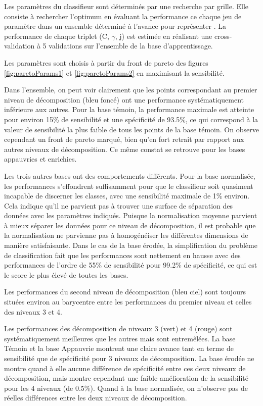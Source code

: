 Les paramètres du classifieur sont déterminés par une recherche par grille. Elle consiste à rechercher l'optimum en évaluant la performance ce chaque jeu de paramètre dans un ensemble déterminé à l'avance pour représenter . La performance de chaque triplet (C, $\gamma$, j) est estimée en réalisant une cross-validation à 5 validations sur l'ensemble de la base d'apprentissage.


Les paramètres sont choisis à partir du front de pareto des figures \ref{fig:paretoParams1} et \ref{fig:paretoParams2} en maximisant la sensibilité.

Dans l'ensemble, on peut voir clairement que les points correspondant au premier niveau de décomposition (bleu foncé) ont une performance systématiquement inférieure aux autres. Pour la base témoin, la performance maximale est atteinte pour environ 15\% de sensibilité et une spécificité de 93.5\%, ce qui correspond à la valeur de sensibilité la plus faible de tous les points de la base témoin. On observe cependant un front de pareto marqué, bien qu'en fort retrait par rapport aux autres niveaux de décomposition. Ce même constat se retrouve pour les bases appauvries et enrichies.

Les trois autres bases ont des comportements différents. Pour la base normalisée, les performances s'effondrent suffisamment pour que le classifieur soit quasiment incapable de discerner les classes, avec une sensibilité maximale de 1\% environ. Cela indique qu'il ne parvient pas à trouver une surface de séparation des données avec les paramètres indiqués. Puisque la normalisation moyenne parvient à mieux séparer les données pour ce niveau de décomposition, il est probable que la normalisation ne parvienne pas à homogénéiser les différentes dimensions de manière satisfaisante. Dans le cas de la base érodée, la simplification du problème de classification fait que les performances sont nettement en hausse avec des performances de l'ordre de 55\% de sensibilité pour 99.2\% de spécificité, ce qui est le score le plus élevé de toutes les bases. 

Les performances du second niveau de décomposition (bleu ciel) sont toujours situées environ au barycentre entre les performances du premier niveau et celles des niveaux 3 et 4.

Les performances des décomposition de niveaux 3 (vert) et 4 (rouge) sont systématiquement meilleures que les autres mais sont entremêlées. La base Témoin et la base Appauvrie montrent une claire avance tant en terme de sensibilité que de spécificité pour 3 niveaux de décomposition. La base érodée ne montre quand à elle aucune différence de spécificité entre ces deux niveaux de décomposition, mais montre cependant une faible amélioration de la sensibilité pour les 4 niveaux (de 0.5\%). Quand à la base normalisée, on n'observe pas de réelles différences entre les deux niveaux de décomposition.

